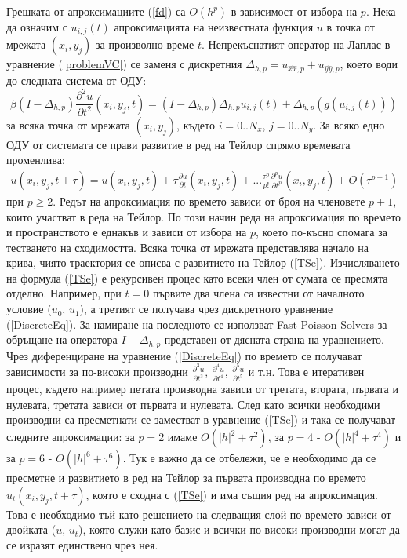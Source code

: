 \documentclass{article}
\newcommand{\be}{\begin{equation}}
\newcommand{\ee}{\end{equation}}
\newcommand{\rf}[1]{(\ref{#1})}
\begin{document}
Грешката от апроксимациите \rf{fd} са $O(h^p)$ в зависимост от избора на $p$. Нека да означим с $u_{i,j}(t)$ апроксимацията на неизвестната функция $u$ в точка от мрежата $(x_i, y_j)$ за произволно време $t$. Непрекъснатият оператор на Лаплас в уравнение \rf{problemVC} се заменя с дискретния $\Delta_{h,p} = u_{\widehat{xx},p} + u_{\widehat{yy},p}$, което води до следната система от ОДУ:
\be \label{DiscreteEq}
\beta (I-\Delta_{h,p}) \frac{\partial^2 u}{\partial t^2}(x_i, y_j, t)=
 (I - \Delta_{h,p})\Delta_{h,p} u_{i, j}(t) + \Delta_{h,p} ( g( u_{i, j}(t) ) )
\ee
за всяка точка от мрежата $(x_i, y_j)$, където $i = 0..N_x$, $j=0..N_y$. За всяко едно ОДУ от системата се прави развитие в ред на Тейлор спрямо времевата променлива:
\begin{align} \label{TSe}
u(x_i, y_j, t+\tau) = u(x_i, y_j, t) + \tau \frac{ \partial u }{ \partial t }(x_i, y_j, t)  + ... 
\frac{ \tau^p }{ p! } \frac{ \partial^p u }{ \partial t^p }(x_i, y_j, t) + O(\tau^{p+1})
\end{align}
при $p \ge 2$. Редът на апроксимация по времето зависи от броя на членовете $p+1$, които участват в реда на Тейлор. По този начин реда на апроксимация по времето и пространството е еднакъв и зависи от избора на $p$, което по-късно спомага за тестването на сходимостта. Всяка точка от мрежата представлява начало на крива, чиято траектория се описва с развитието на Тейлор \rf{TSe}. Изчисляването на формула \rf{TSe} е рекурсивен процес като всеки член от сумата се пресмята отделно. Например, при $t=0$ първите два члена са известни от началното условие ($u_0$, $u_1$), а третият се получава чрез дискретното уравнение \rf{DiscreteEq}. За намиране на последното се използват Fast Poisson Solvers за обръщане на оператора $I-\Delta_{h,p}$ представен от дясната страна на уравнението. Чрез диференциране на уравнение \rf{DiscreteEq} по времето се получават зависимости за по-високи производни $\frac{\partial^3 u}{\partial t^3}$, $\frac{\partial^4 u}{\partial t^4}$, $\frac{\partial^5 u}{\partial t^5}$ и т.н.  Това е итеративен процес, където например петата производна зависи от третата, втората, първата и нулевата, третата зависи от първата и нулевата. След като всички необходими производни са пресметнати се заместват в уравнение \rf{TSe} и така се получават следните апроксимации: за $p=2$ имаме $O(|h|^2 + \tau^2)$, за $p=4$ - $O(|h|^4 + \tau^4)$ и за $p=6$ - $O(|h|^6 + \tau^6)$. Тук е важно да се отбележи, че е необходимо да се пресметне и развитието в ред на Тейлор за първата производна по времето $u_t(x_i, y_j, t+\tau)$, която е сходна с \rf{TSe} и има същия ред на апроксимация. Това е необходимо тъй като решението на следващия слой по времето зависи от двойката ($u$, $u_t$), която служи като базис и всички по-високи производни могат да се изразят единствено чрез нея.
\end{document}
